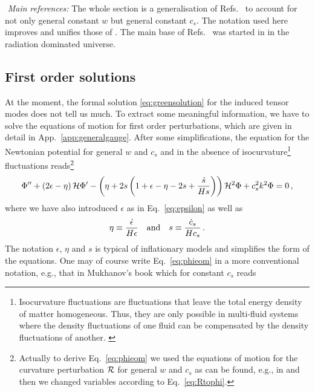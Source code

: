 \documentclass[a4paper,11pt]{article}
\numberwithin{equation}{section}
\begin{document}
\noindent\faBook\,\,\textit{Main references:} The whole section is a generalisation of Refs.~\cite{Domenech:2019quo,Domenech:2020kqm} to account for not only general constant $w$ but general constant $c_s$. The notation used here improves and unifies those of \cite{Domenech:2019quo,Domenech:2020kqm}. The main base of Refs.~\cite{Domenech:2019quo,Domenech:2020kqm} was started in \cite{Baumann:2007zm,Kohri:2018awv} in the radiation dominated universe.

\subsection{First order solutions \label{sec:firstorder}}

At the moment, the formal solution \eqref{eq:greensolution} for the induced tensor modes does not tell us much. To extract some meaningful information, we have to solve the equations of motion for first order perturbations, which are given in detail in App.~\ref{app:generalgauge}. After some simplifications, the equation for the Newtonian potential for general $w$ and $c_s$ and in the absence of isocurvature\footnote{Isocurvature fluctuations are fluctuations that leave the total energy density of matter homogeneous. Thus, they are only possible in multi-fluid systems where the density fluctuations of one fluid can be compensated by the density fluctuations of another. \label{footnote:isocurvature}} fluctuations reads\footnote{Actually to derive Eq.~\eqref{eq:phieom} we used the equations of motion for the curvature perturbation ${\cal R}$ for general $w$ and $c_s$ as can be found, e.g., in \cite{Garriga:1999vw,Koyama:2010xj} and then we changed variables according to Eq.~\eqref{eq:Rtophi}.}
\begin{equation}\label{eq:phieom}
\Phi''+\left(2\epsilon-\eta\right){\cal H}\Phi'-\left(\eta+2s\left(1+\epsilon-\eta-2s+\frac{\dot s}{Hs}\right)\right){\cal H}^2\Phi+c_s^2k^2\Phi=0\,,
\end{equation}
where we have also introduced $\epsilon$ as in Eq.~\eqref{eq:epsilon} as well as
\begin{equation}\label{eq:eta}
\eta\equiv \frac{\dot\epsilon}{H\epsilon}\quad{\rm and}\quad s\equiv\frac{\dot c_s}{Hc_s}\,.
\end{equation}
The notation $\epsilon$, $\eta$ and $s$ is typical of inflationary models and simplifies the form of the equations. One may of course write Eq.~\eqref{eq:phieom} in a more conventional notation, e.g., that in Mukhanov's book \cite{Mukhanov:2005sc} which for constant $c_s$ reads
\end{document}

